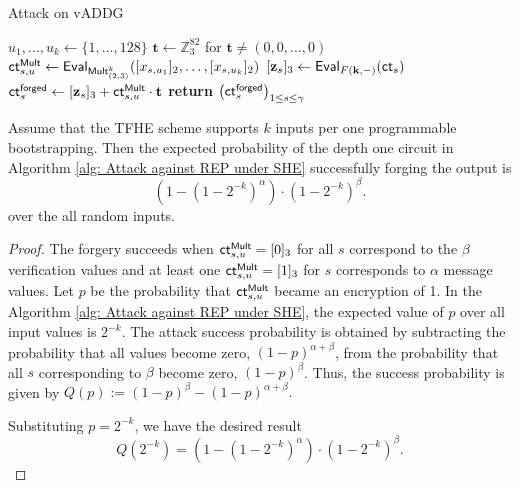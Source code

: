 \documentclass[runningheads]{llncs}
\newcommand{\bb}[1]{\mathbb{#1}}  %
\newcommand{\ct}{\textsf{ct}{}}
\newcommand{\eval}{\textsf{Eval}}
\begin{document}
        \begin{algorithm}
            \caption{Attack on vADDG}
            \label{alg: Attack against REP under SHE}
            \begin{algorithmic}[1]
                \Procedure{$\mathsf{vADDG\_Attack}$}{$(\ct_s),k$} \Comment{$\ct_s=[\mathbf x_s]_2=([x_{s,1}]_2,\dots,[x_{s,128}]_2)$ \begin{flushright}
                    for $1\leq s\leq\gamma$.
                \end{flushright}}
                    \State $u_1,\dots, u_k\gets\{1,\dots, 128\}$
                    \State $\mathbf t\gets\bb Z_3^{82}$ for $\mathbf t\neq ({0,0,\dots,0})$ 
                    \State $\ct_{s,u}^{\sf Mult}\gets \eval_{\mathsf{Mult}^k_{(2,3)}}([x_{s,u_1}]_2,\dots,[x_{s,u_k}]_2)$
                    \State $[\mathbf{z}_s]_3\gets\eval_{F(\bf k,-)}(\ct_s)$ 
                    \State $\ct^{\sf forged}_{s}\gets[{\bf z}_{s}]_3 + \ct_{s,u}^{\sf Mult}\cdot \mathbf{t}$  
                    \EndFor
                    \State \textbf{return} $\left(\ct_{s}^{\sf forged}\right)_{1\leq s\leq \gamma}$
                \EndProcedure
            \end{algorithmic}
        \end{algorithm}
        \begin{theorem}
                Assume that the TFHE scheme supports $k$ inputs per one programmable bootstrapping. Then the expected probability of the depth one circuit in Algorithm \ref{alg: Attack against REP under SHE} successfully forging the output is   
                    \[
                        \left(1-\left(1-2^{-k}\right)^\alpha\right)\cdot \left(1-2^{-k}\right)^\beta.
                    \] over the all random inputs.
        \end{theorem}
        \begin{proof}
                The forgery succeeds when $\ct_{s,u}^{\sf Mult}=[0]_3$ for all $s$ correspond to the $\beta$ verification values and at least one $\ct_{s,u}^{\sf Mult}=[1]_3$ for $s$ corresponds to $\alpha$ message values. Let $p$ be the probability that $\ct_{s,u}^{\sf Mult}$ became an encryption of 1. In the Algorithm \ref{alg: Attack against REP under SHE}, the expected value of $p$ over all input values is $2^{-k}$. The attack success probability is obtained by subtracting the probability that all values become zero, $\left(1-p\right)^{\alpha+\beta}$, from the probability that all $s$ corresponding to $\beta$ become zero, $(1-p)^\beta$.  
                Thus, the success probability is given by $Q(p):=\left(1-p\right)^\beta - \left(1-p\right)^{\alpha+\beta}.$
                
                Substituting $p=2^{-k}$, we have the desired result
                \[
                Q(2^{-k})=\left(1-\left(1-2^{-k}\right)^\alpha\right)\cdot \left(1-2^{-k}\right)^\beta. 
                \]
        \end{proof} 
        
\end{document}
